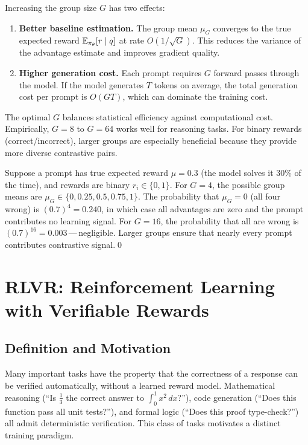 Increasing the group size $G$ has two effects:
\begin{enumerate}[leftmargin=*]
  \item \textbf{Better baseline estimation.} The group mean $\mu_G$ converges to the true expected reward $\operatorname{\mathbb{E}}_{\pi_\theta}[r \mid q]$ at rate $O(1/\sqrt{G})$.  This reduces the variance of the advantage estimate and improves gradient quality.
  \item \textbf{Higher generation cost.} Each prompt requires $G$ forward passes through the model.  If the model generates $T$ tokens on average, the total generation cost per prompt is $O(GT)$, which can dominate the training cost.
\end{enumerate}
The optimal $G$ balances statistical efficiency against computational cost.  Empirically, $G = 8$ to $G = 64$ works well for reasoning tasks.  For binary rewards (correct/incorrect), larger groups are especially beneficial because they provide more diverse contrastive pairs.

\begin{example}
\label{ex:grpo-group-size}
Suppose a prompt has true expected reward $\mu = 0.3$ (the model solves it 30\% of the time), and rewards are binary $r_i \in \{0, 1\}$.  For $G = 4$, the possible group means are $\mu_G \in \{0, 0.25, 0.5, 0.75, 1\}$.  The probability that $\mu_G = 0$ (all four wrong) is $(0.7)^4 = 0.240$, in which case all advantages are zero and the prompt contributes no learning signal.  For $G = 16$, the probability that all are wrong is $(0.7)^{16} = 0.003$\,---\,negligible.  Larger groups ensure that nearly every prompt contributes contrastive signal.\qed
\end{example}

\section{RLVR: Reinforcement Learning with Verifiable Rewards}
\label{sec:rlvr}


\subsection{Definition and Motivation}

Many important tasks have the property that the correctness of a response can be verified automatically, without a learned reward model.  Mathematical reasoning (``Is $\frac{1}{3}$ the correct answer to $\int_0^1 x^2\,dx$?''), code generation (``Does this function pass all unit tests?''), and formal logic (``Does this proof type-check?'') all admit deterministic verification.  This class of tasks motivates a distinct training paradigm.

